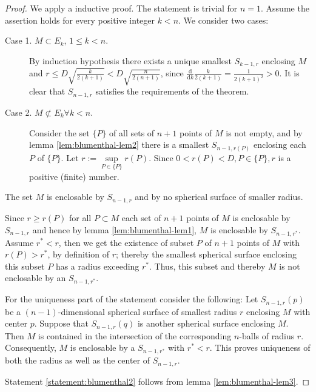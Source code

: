 \begin{proof}
	We apply a inductive proof. The statement is trivial for $n=1$. Assume the assertion holds for every positive integer $k<n$. We consider two cases:
	\begin{description}
		\item[Case 1. $M\subset E_k$, $1\leq k<n$.] By induction hypothesis there exists a unique smallest $S_{k-1,r}$ enclosing $M$ and $r\leq D\sqrt{\frac{k}{2(k+1)}}<D\sqrt{\frac{n}{2(n+1)}}$, since $\frac{\mathrm{d}}{\mathrm{d}k}\frac{k}{2(k+1)}=\frac{1}{2(k+1)^2}>0$. It is clear that $S_{n-1,r}$ satisfies the requirements of the theorem.
		\item[Case 2. $M\not\subset E_k$\hspace{1ex}$\forall k<n$.] Consider the set $\{P\}$ of all sets of $n+1$ points of $M$ is not empty, and by lemma \ref{lem:blumenthal-lem2} there is a smallest $S_{n-1,r(P)}$ enclosing each $P$ of $\{P\}$. Let $r:=\sup\limits_{P\in \{P\}}r(P)$. Since $0<r(P)<D, P\in \{P\}, r$ is a positive (finite) number.
	\end{description}

\begin{myassertion*}
	The set $M$ is enclosable by $S_{n-1,r}$ and by no spherical surface of smaller radius.
\end{myassertion*}

Since $r\geq r(P)$ for all $P\subset M$ each set of $n+1$ points of $M$ is enclosable by $S_{n-1,r}$ and hence by lemma \ref{lem:blumenthal-lem1}, $M$ is enclosable by $S_{n-1,r^\ast}$. Assume $r^\ast<r$, then we get the existence of subset $P$ of $n+1$ points of $M$ with $r(P)>r^\ast$, by definition of $r$; thereby the smallest spherical surface enclosing this subset $P$ has a radius exceeding $r^\ast$. Thus, this subset and thereby $M$ is not enclosable by an $S_{n-1,r^\ast}$.

For the uniqueness part of the statement consider the following: Let $S_{n-1,r}(p)$ be a $(n-1)$-dimensional spherical surface of smallest radius $r$ enclosing $M$ with center $p$. Suppose that $S_{n-1,r}(q)$ is another spherical surface enclosing $M$. Then $M$ is contained in the intersection of the corresponding $n$-balls of radius $r$. Consequently, $M$ is enclosable by a $S_{n-1,r^\ast}$ with $r^\ast<r$. This proves uniqueness of both the radius as well as the center of $S_{n-1,r}$.

Statement \ref{statement:blumenthal2} follows from lemma \ref{lem:blumenthal-lem3}.
\end{proof}

